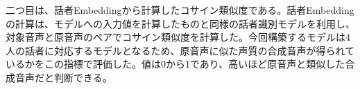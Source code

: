 \documentclass[12pt]{jarticle}
\numberwithin{equation}{section}    %
\numberwithin{figure}{section}      %
\numberwithin{table}{section}      %
\begin{document}
二つ目は、話者Embeddingから計算したコサイン類似度である。話者Embeddingの計算は、モデルへの入力値を計算したものと同様の話者識別モデルを利用し、対象音声と原音声のペアでコサイン類似度を計算した。今回構築するモデルは4人の話者に対応するモデルとなるため、原音声に似た声質の合成音声が得られているかをこの指標で評価した。値は0から1であり、高いほど原音声と類似した合成音声だと判断できる。


\end{document}
